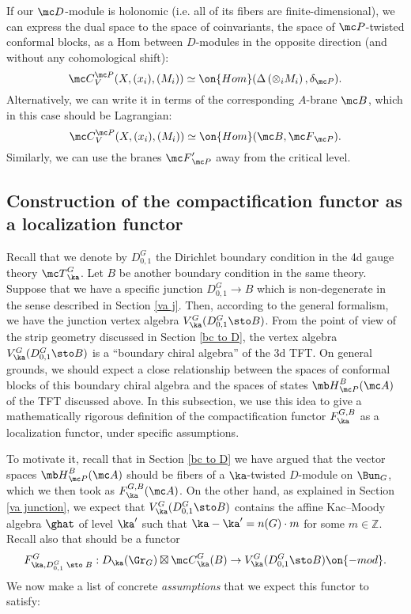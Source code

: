 \documentclass[11pt,reqno]{amsart}
\theoremstyle{plain}
\numberwithin{equation}{section}
\newcommand{\Z}{\mathbb{Z}}
\theoremstyle{definition}
\begin{document}
If our ${\mc D}$-module is holonomic (i.e. all of its fibers are
finite-dimensional), we can express the dual space to the space of
coinvariants, the space of ${\mc P}$-twisted conformal blocks, as
a Hom between $D$-modules in the opposite direction (and without any
cohomological shift):
$$
{\mc C}^{\mc P}_V(X,(x_i),(M_i)) \simeq \on{Hom}(\Delta\left( \otimes_i
  M_i \right),\delta_{\mc P}).
$$
Alternatively, we can write it in terms of the corresponding $A$-brane
${\mc B}$, which in this case should be Lagrangian:
$$
{\mc C}^{\mc P}_V(X,(x_i),(M_i)) \simeq \on{Hom}({\mc B},{\mc
  F}_{\mc P}).
$$
Similarly, we can use the branes ${\mc F}'_{\mc P}$ away from the
critical level.

\subsection{Construction of the compactification functor as a
  localization functor}    \label{comp and loc}

Recall that we denote by $D^G_{0,1}$ the Dirichlet boundary condition
in the 4d gauge theory ${\mc T}^G_\ka$. Let $B$ be another boundary
condition in the same theory. Suppose that we have a specific junction
$D^G_{0,1} \to B$ which is non-degenerate in the sense described in
Section \ref{va j}. Then, according to the general formalism, we have
the junction vertex algebra $V^G_\ka(D^G_{0,1}\sto B)$. From the point
of view of the strip geometry discussed in Section \ref{bc to D}, the
vertex algebra $V^G_\ka(D^G_{0,1}\sto B)$ is a ``boundary chiral
algebra'' of the 3d TFT. On general grounds, we should expect a close
relationship between the spaces of conformal blocks of this boundary
chiral algebra and the spaces of states ${\mb H}^B_{\mc P}({\mc A})$
of the TFT discussed above. In this subsection, we use this idea to
give a mathematically rigorous definition of the compactification
functor $F^{G,B}_\ka$ as a localization functor, under specific
assumptions.

To motivate it, recall that in Section \ref{bc to D} we have argued
that the vector spaces ${\mb H}^B_{\mc P}({\mc A})$ should be fibers
of a $\ka$-twisted $D$-module on $\Bun_G$, which we then took as
$F^{G,B}_\ka({\mc A})$. On the other hand, as explained in Section
\ref{va junction}, we expect that $V^G_\ka(D^G_{0,1}\sto B)$ contains
the affine Kac--Moody algebra $\ghat$ of level $\ka'$ such that $\ka -
\ka' = n(G) \cdot m$ for some $m \in \Z$. Recall also that should be a
functor
\begin{equation}    \label{FGka}
F^G_{\ka,D^G_{0,1}\; \sto \; B}: D_\ka(\Gr_G) \boxtimes {\mc C}^G_\ka(B)
\to V^G_\ka(D^G_{0,1}\sto B)\on{-mod}.
\end{equation}
We now make a list of concrete {\em assumptions} that we expect this
functor to satisfy:
\end{document}

